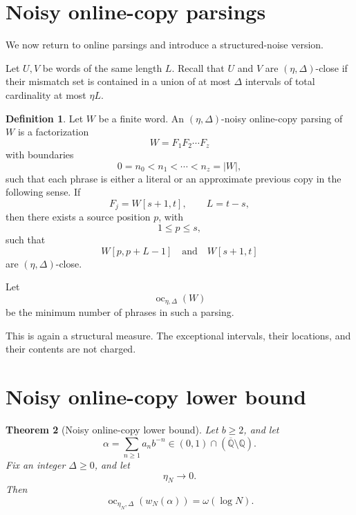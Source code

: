 \documentclass[11pt]{amsart}
\newtheorem{theorem}{Theorem}[section]
\theoremstyle{definition}
\newtheorem{definition}[theorem]{Definition}
\DeclareMathOperator{\oc}{oc}
\begin{document}
\section{Noisy online-copy parsings}

We now return to online parsings and introduce a structured-noise version.

Let \(U,V\) be words of the same length \(L\). Recall that \(U\) and \(V\) are \((\eta,\Delta)\)-close if their mismatch set is contained in a union of at most \(\Delta\) intervals of total cardinality at most \(\eta L\).

\begin{definition}
Let \(W\) be a finite word. An \((\eta,\Delta)\)-noisy online-copy parsing of \(W\) is a factorization
\[
W=F_1F_2\cdots F_z
\]
with boundaries
\[
0=n_0<n_1<\cdots<n_z=|W|,
\]
such that each phrase is either a literal or an approximate previous copy in the following sense. If
\[
F_j=W[s+1,t],
\qquad
L=t-s,
\]
then there exists a source position \(p\), with
\[
1\leq p\leq s,
\]
such that
\[
W[p,p+L-1]
\quad\text{and}\quad
W[s+1,t]
\]
are \((\eta,\Delta)\)-close.
\end{definition}

Let
\[
\oc_{\eta,\Delta}(W)
\]
be the minimum number of phrases in such a parsing.

This is again a structural measure. The exceptional intervals, their locations, and their contents are not charged.

\section{Noisy online-copy lower bound}

\begin{theorem}[Noisy online-copy lower bound]
Let \(b\geq 2\), and let
\[
\alpha=\sum_{n\geq 1}a_n b^{-n}
\in(0,1)\cap(\overline{\mathbb Q}\setminus\mathbb Q).
\]
Fix an integer \(\Delta\geq 0\), and let
\[
\eta_N\to 0.
\]
Then
\[
\oc_{\eta_N,\Delta}(w_N(\alpha))
=
\omega(\log N).
\]
\end{theorem}
\end{document}
